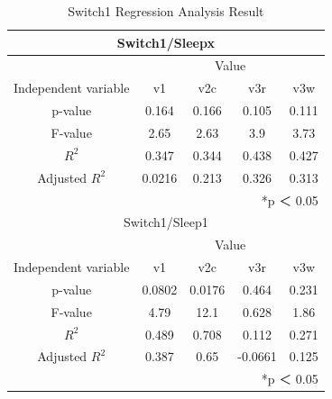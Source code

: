 \documentclass[11pt
  , a4paper
  , article
  , oneside
]{memoir}
\begin{document}
\begin{table}[h!]
\begin{center}
\begin{tabular}{c|c||c||c||c}
\multicolumn{5}{c}{Switch1/Sleepx}\\ \hline\hline
\multicolumn{1}{c|}{}& \multicolumn{4}{c}{Value}\\
\cline{1-5}
Independent variable & v1 & v2c & v3r & v3w      \\ \hline\hline
p-value &  0.164 &  0.166 & 0.105  &  0.111\\ 
F-value &  2.65 &  2.63&  3.9 &  3.73\\ 
$  R^2  $ &  0.347  &  0.344&  0.438 &  0.427\\ 
Adjusted $  R^2  $ & 0.0216 & 0.213 & 0.326 & 0.313\\ \hline\hline
\multicolumn{5}{r}{*p ＜ 0.05} \\
\multicolumn{5}{c}{Switch1/Sleep1}\\ \hline\hline
\multicolumn{1}{c|}{}& \multicolumn{4}{c}{Value}\\
\cline{1-5}
Independent variable & v1 & v2c & v3r & v3w     \\ \hline\hline
p-value &  0.0802 &  0.0176& 0.464 &  0.231\\ 
F-value &  4.79  &  12.1&  0.628 &  1.86\\ 
$  R^2  $ &  0.489 &  0.708 &  0.112  &  0.271\\ 
Adjusted $  R^2  $ & 0.387 & 0.65 & -0.0661 & 0.125\\ \hline\hline
\multicolumn{5}{r}{*p ＜ 0.05} 
\end{tabular}
\caption{Switch1 Regression Analysis Result }
\end{center}
\end{table} 
\clearpage
\end{document}
